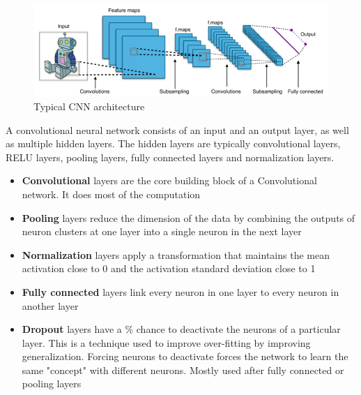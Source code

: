 \begin{figure}[h]
	\centering
	\caption[Typical convolutional neural network architecture]{Typical CNN architecture \cite{cnn_fig}}
	\label{fig:cnn}
	\includegraphics[width=1.1\textwidth, height=1.5\textheight, keepaspectratio]{"resources/typical_cnn"}
\end{figure}

\par
A convolutional neural network consists of an input and an output layer, as well as multiple hidden layers. The hidden layers are typically convolutional layers, RELU layers, pooling layers, fully connected layers and normalization layers. \cite{cnn_git}

\begin{itemize}
	\item \textbf{Convolutional} layers are the core building block of a Convolutional network. It does most of the computation
	\item \textbf{Pooling} layers reduce the dimension of the data by combining the outputs of neuron clusters at one layer into a single neuron in the next layer
	\item \textbf{Normalization} layers apply a transformation that maintains the mean activation close to 0 and the activation standard deviation close to 1
	\item \textbf{Fully connected} layers link every neuron in one layer to every neuron in another layer
	\item \textbf{Dropout} layers have a \% chance to deactivate the neurons of a particular layer. This is a technique used to improve over-fitting by improving generalization. Forcing neurons to deactivate forces the network to learn the same "concept" with different neurons. Mostly used after fully connected or pooling layers
\end{itemize}


